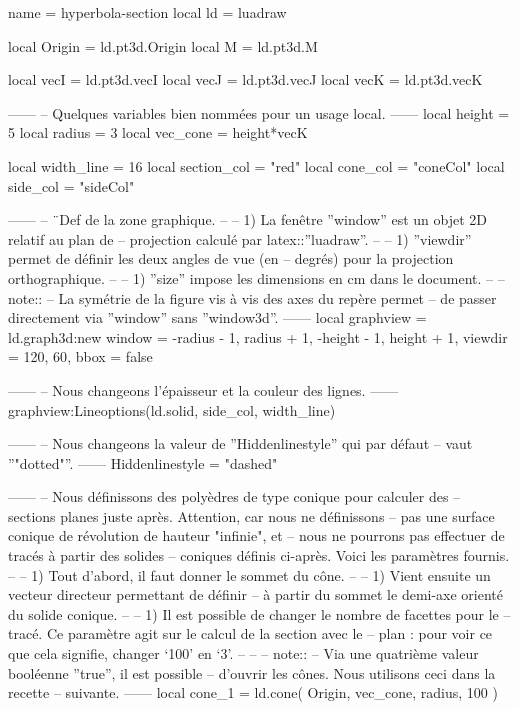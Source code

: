 \documentclass{standalone}
\begin{document}
\begin{luadraw*}{name = hyperbola-section}
local ld = luadraw

local Origin = ld.pt3d.Origin
local M      = ld.pt3d.M

local vecI = ld.pt3d.vecI
local vecJ = ld.pt3d.vecJ
local vecK = ld.pt3d.vecK

------
-- Quelques variables bien nommées pour un usage local.
------
local height   =  5
local radius   =  3
local vec_cone = height*vecK

local width_line  =  16
local section_col = "red"
local cone_col    = "coneCol"
local side_col    = "sideCol"

------
-- ¨Def de la zone graphique.
--
--     1) La fenêtre ''window'' est un objet 2D relatif au plan de
--     projection calculé par latex::''luadraw''.
--
--     1) ''viewdir'' permet de définir les deux angles de vue (en
--     degrés) pour la projection orthographique.
--
--     1) ''size'' impose les dimensions en cm dans le document.
--
-- note::
--     La symétrie de la figure vis à vis des axes du repère permet
--     de passer directement via ''window'' sans ''window3d''.
------
local graphview = ld.graph3d:new{
  window  = {-radius - 1, radius + 1, -height - 1, height + 1},
  viewdir = {120, 60},
  bbox    = false
}

------
-- Nous changeons l'épaisseur et la couleur des lignes.
------
graphview:Lineoptions(ld.solid, side_col, width_line)

------
-- Nous changeons la valeur de ''Hiddenlinestyle'' qui par défaut
-- vaut ''"dotted"''.
------
Hiddenlinestyle = "dashed"

------
-- Nous définissons des polyèdres de type conique pour calculer des
-- sections planes juste après. Attention, car nous ne définissons
-- pas une surface conique de révolution de hauteur "infinie", et
-- nous ne pourrons pas effectuer de tracés à partir des solides
-- coniques définis ci-après. Voici les paramètres fournis.
--
--     1) Tout d'abord, il faut donner le sommet du cône.
--
--     1) Vient ensuite un vecteur directeur permettant de définir
--     à partir du sommet le demi-axe orienté du solide conique.
--
--     1) Il est possible de changer le nombre de facettes pour le
--     tracé. Ce paramètre agit sur le calcul de la section avec le
--     plan : pour voir ce que cela signifie, changer `100' en `3'.
--
--
-- note::
--     Via une quatrième valeur booléenne ''true'', il est possible
--     d'ouvrir les cônes. Nous utilisons ceci dans la recette
--     suivante.
------
local cone_1 = ld.cone(
  Origin, vec_cone, radius,
  100
)


\end{luadraw*}
\end{document}
